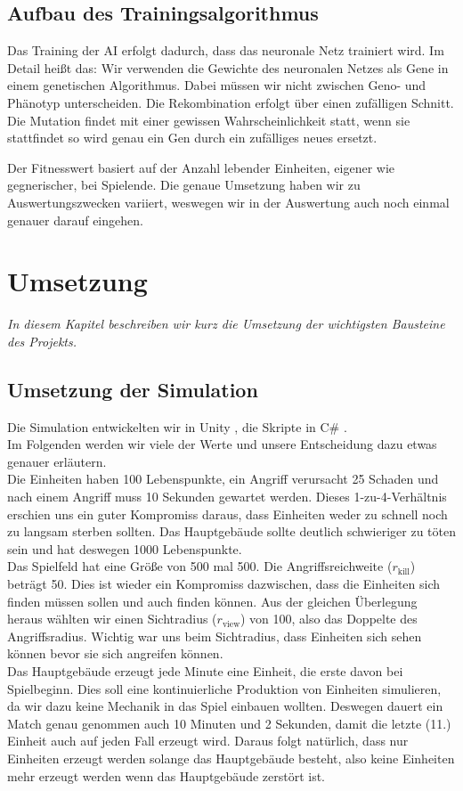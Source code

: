 \documentclass[
	12pt,
	a4paper,
	BCOR10mm,
	DIV14,
	headsepline,
	usegeometry,
]{scrreprt}
\begin{document}
\section{Aufbau des Trainingsalgorithmus}
Das Training der AI erfolgt dadurch, dass das neuronale Netz trainiert wird.
Im Detail heißt das: Wir verwenden die Gewichte des neuronalen Netzes als Gene in einem genetischen Algorithmus.
Dabei müssen wir nicht zwischen Geno- und Phänotyp unterscheiden.
Die Rekombination erfolgt über einen zufälligen Schnitt.
Die Mutation findet mit einer gewissen Wahrscheinlichkeit statt, wenn sie stattfindet so wird genau ein Gen durch ein zufälliges neues ersetzt.

Der Fitnesswert basiert auf der Anzahl lebender Einheiten, eigener wie gegnerischer, bei Spielende.
Die genaue Umsetzung haben wir zu Auswertungszwecken variiert, weswegen wir in der Auswertung auch noch einmal genauer darauf eingehen.

\chapter{Umsetzung}
\label{Umsetzung}

\textit{%
In diesem Kapitel beschreiben wir kurz die Umsetzung der wichtigsten Bausteine des Projekts.
}

\bigskip

\section{Umsetzung der Simulation}

Die Simulation entwickelten wir in Unity \cite{Unity}, die Skripte in C\# .\\
Im Folgenden werden wir viele der Werte und unsere Entscheidung dazu etwas genauer erläutern.\\
Die Einheiten haben 100 Lebenspunkte, ein Angriff verursacht 25 Schaden und nach einem Angriff muss 10 Sekunden gewartet werden. Dieses 1-zu-4-Verhältnis erschien uns ein guter Kompromiss daraus, dass Einheiten weder zu schnell noch zu langsam sterben sollten. Das Hauptgebäude sollte deutlich schwieriger zu töten sein und hat deswegen 1000 Lebenspunkte.\\
Das Spielfeld hat eine Größe von 500 mal 500. Die Angriffsreichweite ($r_{\text{kill}}$) beträgt 50. Dies ist wieder ein Kompromiss dazwischen, dass die Einheiten sich finden müssen sollen und auch finden können. Aus der gleichen Überlegung heraus wählten wir einen Sichtradius ($r_{\text{view}}$) von 100, also das Doppelte des Angriffsradius. Wichtig war uns beim Sichtradius, dass Einheiten sich sehen können bevor sie sich angreifen können.\\
Das Hauptgebäude erzeugt jede Minute eine Einheit, die erste davon bei Spielbeginn. Dies soll eine kontinuierliche Produktion von Einheiten simulieren, da wir dazu keine Mechanik in das Spiel einbauen wollten. Deswegen dauert ein Match genau genommen auch 10 Minuten und 2 Sekunden, damit die letzte (11.) Einheit auch auf jeden Fall erzeugt wird. Daraus folgt natürlich, dass nur Einheiten erzeugt werden solange das Hauptgebäude besteht, also keine Einheiten mehr erzeugt werden wenn das Hauptgebäude zerstört ist.
\end{document}
